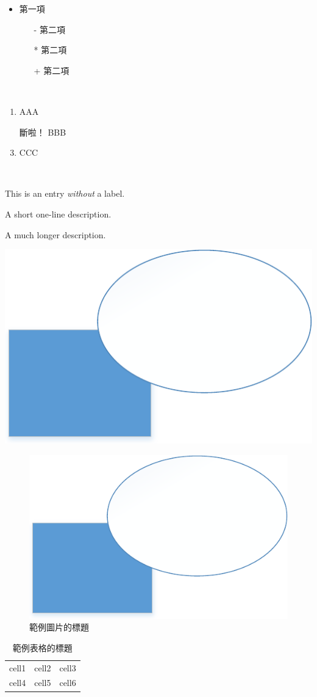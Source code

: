 \documentclass[12pt]{article}
\begin{document}
\begin{CJK*}{UTF8}{bkai}
	\begin{itemize}
		\item 第一項
			\begin{itemize}
			\item[-] 第二項
			\item[*] 第二項
			\item[+] 第二項
			\end{itemize}
	\end{itemize}
	\mbox{}\\
	\begin{enumerate}
		\item AAA
		\item[斷啦！] BBB
		\item CCC
	\end{enumerate}
	\mbox{}\\
	\begin{description}
	\item This is an entry \textit{without} a label.
	\item[變粗！] A short one-line description.
	\item[變粗？] A much longer description.
	\end{description}

	\graphicspath{{./fig/}{./}} %
	
	\begin{center}
		\includegraphics[width=0.3\linewidth]{p1.pdf}
	\end{center}

	\begin{figure}[!htb]
		\centering
		\includegraphics[width=0.3\linewidth]{p1.pdf}
		\caption{範例圖片的標題}
		\label{fig:FFFFF}		
	\end{figure}
	
	\begin{table}[!htb]
		\centering
		\caption{範例表格的標題}
		\label{table:TTTTT}	
		\begin{tabular}{ c c c }
			cell1 & cell2 & cell3 \\ 
			cell4 & cell5 & cell6
		\end{tabular}	
	\end{table}


\end{CJK*}
\end{document}
